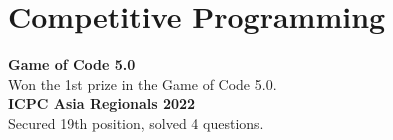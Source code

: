 \documentclass[]{m abbas resume' 2022}
\begin{document}
\begin{minipage}[t]{0.51\textwidth}
    
    
    


\section{Competitive Programming} 
\textbf{Game of Code 5.0}\\
Won the 1st prize in the Game of Code 5.0. \\
\textbf{ICPC Asia Regionals 2022}\\
Secured 19th position, solved 4 questions. \\ 


%
%

\end{minipage} 
\end{document}

